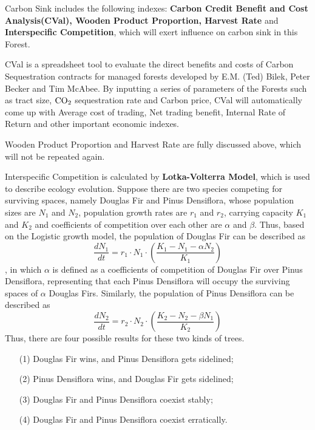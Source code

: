 \documentclass{mcmthesis}
\numberwithin{figure}{section}
\numberwithin{table}{section}
\numberwithin{equation}{section}
\begin{document}
Carbon Sink includes the following indexes: \textbf{Carbon Credit Benefit and 
Cost Analysis(CVal), Wooden Product Proportion, Harvest Rate} and \textbf{Interspecific 
Competition}, which will exert influence on carbon sink in this Forest.
\par
CVal is a spreadsheet tool to evaluate the direct benefits and costs of Carbon 
Sequestration contracts for managed forests developed by E.M. (Ted) Bilek,
Peter Becker and Tim McAbee. By inputting a series of parameters of the Forests
such as tract size, $ \rm{CO_2} $ sequestration rate and Carbon price, CVal will
automatically come up with Average cost of trading, Net trading benefit, 
Internal Rate of Return and other important economic indexes. 
\par
Wooden Product Proportion and Harvest Rate are fully discussed above, which will not
be repeated again.
\par
Interspecific Competition is calculated by \textbf{Lotka-Volterra Model}, which is 
used to describe ecology evolution.
Suppose there are two species competing for surviving spaces, namely
Douglas Fir and Pinus Densiflora, whose population sizes are $ N_1 $ and $ N_2 $, population growth rates
are $ r_1 $ and $ r_2 $, carrying capacity $ K_1 $ and $ K_2 $ and coefficients of competition over each other 
are $ \alpha $ and $ \beta $. 
Thus, based on the Logistic growth model, the population of Douglas Fir
can be described as 
$$
  \frac{dN_1}{dt} = r_1\cdot N_1\cdot (\frac{K_1-N_1-\alpha N_2}{K_1})
$$ 
, in which $ \alpha $ is defined as a coefficients of competition of Douglas Fir over Pinus Densiflora,
representing that each Pinus Densiflora will occupy the surviving spaces of
 $ \alpha $ Douglas Firs.
 Similarly, the population of Pinus Densiflora can be described as $$
 \frac{dN_2}{dt} = r_2\cdot N_2\cdot (\frac{K_2-N_2-\beta N_1}{K_2})
 $$ 
Thus, there are four possible results for these two kinds of trees.
\begin{enumerate}
  \item [(1)] Douglas Fir wins, and Pinus Densiflora gets sidelined;
  \item [(2)] Pinus Densiflora wins, and Douglas Fir gets sidelined;
  \item [(3)] Douglas Fir and Pinus Densiflora coexist stably;
  \item [(4)] Douglas Fir and Pinus Densiflora coexist erratically.
\end{enumerate}
\end{document}
